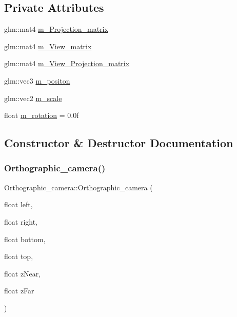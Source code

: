 \subsection*{Private Attributes}
\begin{DoxyCompactItemize}
\item 
glm\+::mat4 \hyperlink{classOrthographic__camera_ab86fab9f0ee868e8cca74ded191c4ab9}{m\+\_\+\+Projection\+\_\+matrix}
\item 
glm\+::mat4 \hyperlink{classOrthographic__camera_aadb603c787908e6b7545baa3367dd0bc}{m\+\_\+\+View\+\_\+matrix}
\item 
glm\+::mat4 \hyperlink{classOrthographic__camera_a3826c2d1b6976581f2d3288432f1b62a}{m\+\_\+\+View\+\_\+\+Projection\+\_\+matrix}
\item 
glm\+::vec3 \hyperlink{classOrthographic__camera_a8ed8a2734597964dea167e5e212174b6}{m\+\_\+positon}
\item 
glm\+::vec2 \hyperlink{classOrthographic__camera_ad26f470c0fc6a7bb4394ddb9b4f9a55f}{m\+\_\+scale}
\item 
float \hyperlink{classOrthographic__camera_aae32e53691911da1651e4fdb82135951}{m\+\_\+rotation} = 0.\+0f
\end{DoxyCompactItemize}


\subsection{Constructor \& Destructor Documentation}
\mbox{\label{classOrthographic__camera_aeb45b5f12a351769d0b80a2926193e7f}} 
\subsubsection{\texorpdfstring{Orthographic\+\_\+camera()}{Orthographic\_camera()}}
{\footnotesize\ttfamily Orthographic\+\_\+camera\+::\+Orthographic\+\_\+camera (\begin{DoxyParamCaption}\item[{float}]{left,  }\item[{float}]{right,  }\item[{float}]{bottom,  }\item[{float}]{top,  }\item[{float}]{z\+Near,  }\item[{float}]{z\+Far }\end{DoxyParamCaption})}

